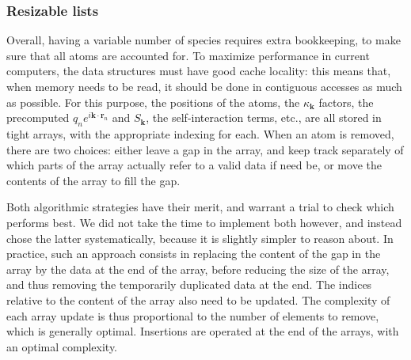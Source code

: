 \documentclass[main.tex]{subfiles}
\begin{document}
%
%
%


\subsubsection{Resizable lists}

Overall, having a variable number of species requires extra bookkeeping, to make sure that all atoms are accounted for. To maximize performance in current computers, the data structures must have good cache locality: this means that, when memory needs to be read, it should be done in contiguous accesses as much as possible. For this purpose, the positions of the atoms, the $\kappa_{\boldsymbol k}$ factors, the precomputed $q_ne^{i\boldsymbol k\cdot \boldsymbol r_n}$ and $S_{\boldsymbol k}$, the self-interaction terms, etc., are all stored in tight arrays, with the appropriate indexing for each. When an atom is removed, there are two choices: either leave a gap in the array, and keep track separately of which parts of the array actually refer to a valid data if need be, or move the contents of the array to fill the gap.

Both algorithmic strategies have their merit, and warrant a trial to check which performs best. We did not take the time to implement both however, and instead chose the latter systematically, because it is slightly simpler to reason about. In practice, such an approach consists in replacing the content of the gap in the array by the data at the end of the array, before reducing the size of the array, and thus removing the temporarily duplicated data at the end. The indices relative to the content of the array also need to be updated. The complexity of each array update is thus proportional to the number of elements to remove, which is generally optimal. Insertions are operated at the end of the arrays, with an optimal complexity.
\end{document}
